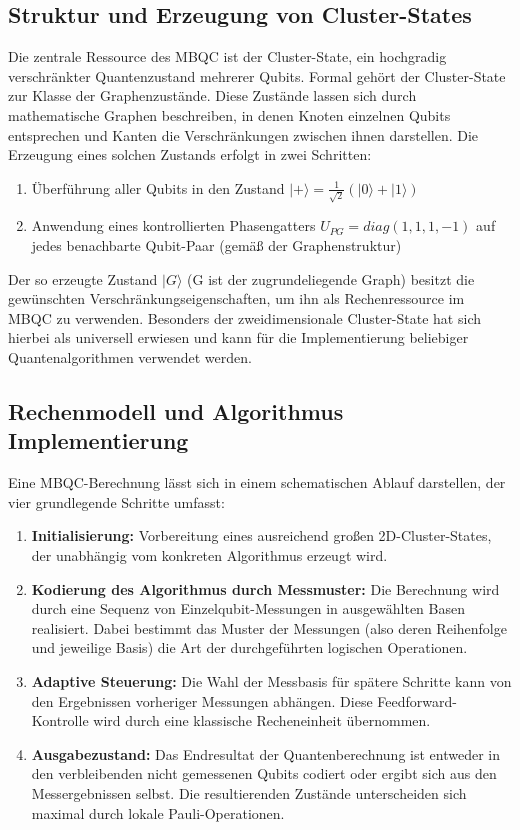 \subsection*{Struktur und Erzeugung von Cluster-States}
Die zentrale Ressource des MBQC ist der Cluster-State, ein hochgradig verschränkter Quantenzustand mehrerer Qubits. Formal gehört der Cluster-State zur Klasse der Graphenzustände. Diese Zustände lassen sich durch mathematische Graphen beschreiben, in denen Knoten einzelnen Qubits entsprechen und Kanten die Verschränkungen zwischen ihnen darstellen. Die Erzeugung eines solchen Zustands erfolgt in zwei Schritten:

\begin{enumerate}
    \item Überführung aller Qubits in den Zustand $|+\rangle = \frac{1}{\sqrt{2}}(|0\rangle + |1\rangle)$
    \item Anwendung eines kontrollierten Phasengatters $U_{PG}=diag(1,1,1,-1)$ auf jedes benachbarte Qubit-Paar (gemäß der Graphenstruktur)
\end{enumerate}

Der so erzeugte Zustand $|G\rangle$ (G ist der zugrundeliegende Graph) besitzt die gewünschten Verschränkungseigenschaften, um ihn als Rechenressource im MBQC zu verwenden. Besonders der zweidimensionale Cluster-State hat sich hierbei als universell erwiesen und kann für die Implementierung beliebiger Quantenalgorithmen verwendet werden. \autocite[2-3]{briegelMeasurementbasedQuantumComputation2009}

\subsection*{Rechenmodell und Algorithmus Implementierung}

Eine MBQC-Berechnung lässt sich in einem schematischen Ablauf darstellen, der vier grundlegende Schritte umfasst:
\begin{enumerate}
    \item \textbf{Initialisierung:} Vorbereitung eines ausreichend großen 2D-Cluster-States, der unabhängig vom konkreten Algorithmus erzeugt wird.
    \item \textbf{Kodierung des Algorithmus durch Messmuster:} Die Berechnung wird durch eine Sequenz von Einzelqubit-Messungen in ausgewählten Basen realisiert. Dabei bestimmt das Muster der Messungen (also deren Reihenfolge und jeweilige Basis) die Art der durchgeführten logischen Operationen.
    \item \textbf{Adaptive Steuerung:} Die Wahl der Messbasis für spätere Schritte kann von den Ergebnissen vorheriger Messungen abhängen. Diese Feedforward-Kontrolle wird durch eine klassische Recheneinheit übernommen.
    \item \textbf{Ausgabezustand:} Das Endresultat der Quantenberechnung ist entweder in den verbleibenden nicht gemessenen Qubits codiert oder ergibt sich aus den Messergebnissen selbst. Die resultierenden Zustände unterscheiden sich maximal durch lokale Pauli-Operationen.
\end{enumerate}

